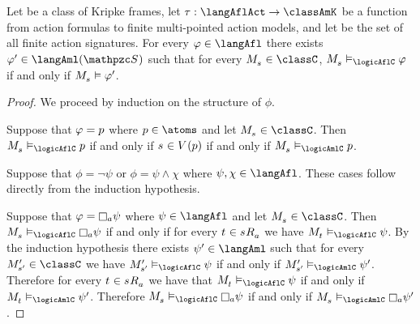 \begin{proposition}
Let \classC{} be a class of Kripke frames, let $\tau : \langAflAct \to \classAmK$ be a function from action formulas to finite multi-pointed action models, and let \aSignatureFamily{} be the set of all finite action signatures.
For every $\phi \in \langAfl$ there exists $\phi' \in \langAml(\aSignatureFamily)$ such that for every $\kPModel{\kStateS} \in \classC$, $\kPModel{\kStateS} \entails_\logicAflC \phi$ if and only if $\kPModel{\kStateS} \entails \phi'$.
\end{proposition}

\begin{proof}
We proceed by induction on the structure of $\phi$.

Suppose that $\varphi = p$ where $\atomP \in \atoms$ and let $\kPModel{\kStateS} \in \classC$.
Then $\kPModel{\kStateS} \entails_\logicAflC \atomP$ if and only if $\kStateS \in \kValuation(\atomP)$ if and only if $\kPModel{\kStateS} \entails_\logicAmlC \atomP$.

Suppose that $\phi = \lnot \psi$ or $\phi = \psi \land \chi$ where $\psi, \chi \in \langAfl$.
These cases follow directly from the induction hypothesis.

Suppose that $\phi = \necessaryA \psi$ where $\psi \in \langAfl$ and let $\kPModel{\kStateS} \in \classC$.
Then $\kPModel{\kStateS} \entails_\logicAflC \necessaryA \psi$ if and only if for every $\kStateT \in \kSuccessorsA{\kStateS}$ we have $\kPModel{\kStateT} \entails_\logicAflC \psi$.
By the induction hypothesis there exists $\psi' \in \langAml$ such that for every $\kPModelP{\kStateSP} \in \classC$ we have $\kPModelP{\kStateSP} \entails_\logicAflC \psi$ if and only if $\kPModelP{\kStateSP} \entails_\logicAmlC \psi'$.
Therefore for every $\kStateT \in \kSuccessorsA{\kStateS}$ we have that $\kPModel{\kStateT} \entails_\logicAflC \psi$ if and only if $\kPModel{\kStateT} \entails_\logicAmlC \psi'$.
Therefore $\kPModel{\kStateS} \entails_\logicAflC \necessaryA \psi$ if and only if $\kPModel{\kStateS} \entails_\logicAmlC \necessaryA \psi'$.


\end{proof}
